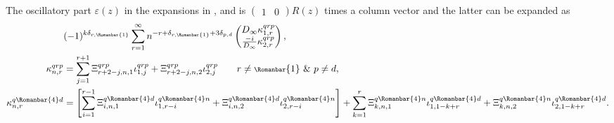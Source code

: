 \documentclass[11pt]{article}
\newcommand{\lld}{L{\tiny\Rleft} d}
\newcommand{\qg}{q}
\newcommand{\rg}{r}
\newcommand{\rb}{{\scriptsize \Romanbar{1}} }
\newcommand{\rl}{{\scriptsize \Romanbar{4}} }
\newcommand{\pg}{p}
\newcommand{\pn}{n}
\newcommand{\pd}{d}
\numberwithin{equation}{section}
\newcommand{\Rleft}{\Romanbar{4}}
\begin{document}
The oscillatory part %
$\varepsilon(z)$ in the expansions in \cite[\S 2.3]{jacobi}, \cite[\S 4]{laguerre} and \cite[\S 2.2]{quadr} %
is $\begin{pmatrix} 1 & 0 \end{pmatrix} R(z)$ times a column vector and the latter can be expanded as
\begin{align}
	 & (-1)^{k\delta_{\rg,\rb} } \sum_{r=1}^\infty n^{-r + \delta_{\rg,\rb}+ 3\delta_{\pg,\pd} } \begin{pmatrix} D_\infty \kappa_{1,r}^{\qg\rg\pg} \\ \frac{-i}{D_\infty} \kappa_{2,r}^{\qg\rg\pg} \end{pmatrix},  \\ %
	\kappa_{n,r}^{\qg\rg\pg} & = \sum_{j=1}^{r+1} \Xi_{r+2-j,n,1}^{\qg\rg\pg} \iota_{1,j}^{\qg\rg\pg} + \Xi_{r+2-j,n,2}^{\qg\rg\pg} \iota_{2,j}^{\qg\rg\pg} \qquad \rg \neq \rb \text{ } \& \text{ } \pg \neq \pd, \\ %
	\kappa_{n,r}^{\qg\rl\pd} & = \left[\sum_{i=1}^{r-1} \Xi_{i,n,1}^{\qg\rl\pd} \iota_{1,r-i}^{\qg\rl\pn} + \Xi_{i,n,2}^{\qg\rl\pd} \iota_{2,r-i}^{\qg\rl\pn} \right]  + \sum_{k =1}^r \Xi_{k,n,1}^{\qg\rl\pn} \iota_{1,1-k+r}^{\qg\rl\pd} + \Xi_{k,n,2}^{\qg\rl\pn} \iota_{2,1-k+r}^{\qg\rl\pd}.%
\end{align}
\end{document}
